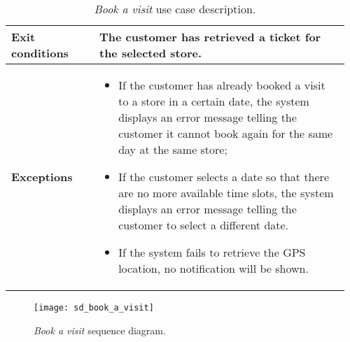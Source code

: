 \begin{table}[H]
\begin{tabular}{@{}p{0.25\linewidth}p{0.71\linewidth}@{}}
    		\textbf{Exit conditions} & The customer has retrieved a ticket for the selected store. \\
    		\midrule
    		\textbf{Exceptions} &
            \begin{itemize}[leftmargin=.4cm,noitemsep,topsep=0pt,before=\vspace{-3mm},after=\vspace{-4mm}]
                \item If the customer has already booked a visit to a store in a certain date, the system displays an error message telling the customer it cannot book again for the same day at the same store;
                \item If the customer selects a date so that there are no more available time slots, the system displays an error message telling the customer to select a different date.
                \item If the system fails to retrieve the GPS location, no notification will be shown.
            \end{itemize} \\

    		\bottomrule
    	\end{tabular}
    	\caption{\textit{Book a visit} use case description.}
    \end{table}

	\begin{figure}[H]
		\centering
		\texttt{[image: sd\_book\_a\_visit]}
		\caption{\textit{Book a visit} sequence diagram.}
	\end{figure}

